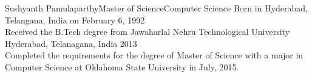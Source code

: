 \newpage
 \begin{vita}{Sushyanth Pamulaparthy}{Master of Science}{Computer Science} %
  Born in Hyderabad, Telangana, India on February 6, 1992
  \\ Received the B.Tech degree from Jawaharlal Nehru Technological University Hyderabad, Telanagana, India 2013\\
Completed the requirements for the degree of Master of Science with a major in Computer Science at Oklahoma State University in July, 2015. 
  \end{vita}
